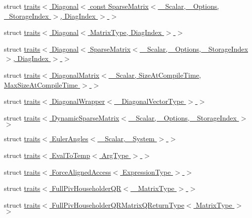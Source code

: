\begin{DoxyCompactItemize}
\item 
struct \hyperlink{struct_eigen_1_1internal_1_1traits_3_01_diagonal_3_01const_01_sparse_matrix_3_01___scalar_00_01_60e2cc1eeaa955bbaca3dbe42dd8c748}{traits$<$ Diagonal$<$ const Sparse\+Matrix$<$ \+\_\+\+Scalar, \+\_\+\+Options, \+\_\+\+Storage\+Index $>$, Diag\+Index $>$ $>$}
\item 
struct \hyperlink{struct_eigen_1_1internal_1_1traits_3_01_diagonal_3_01_matrix_type_00_01_diag_index_01_4_01_4}{traits$<$ Diagonal$<$ Matrix\+Type, Diag\+Index $>$ $>$}
\item 
struct \hyperlink{struct_eigen_1_1internal_1_1traits_3_01_diagonal_3_01_sparse_matrix_3_01___scalar_00_01___option6bd26e34064fdba33a44f3bb621d4cca}{traits$<$ Diagonal$<$ Sparse\+Matrix$<$ \+\_\+\+Scalar, \+\_\+\+Options, \+\_\+\+Storage\+Index $>$, Diag\+Index $>$ $>$}
\item 
struct \hyperlink{struct_eigen_1_1internal_1_1traits_3_01_diagonal_matrix_3_01___scalar_00_01_size_at_compile_timeb0b2868b66e3b20cd28c00acb4409967}{traits$<$ Diagonal\+Matrix$<$ \+\_\+\+Scalar, Size\+At\+Compile\+Time, Max\+Size\+At\+Compile\+Time $>$ $>$}
\item 
struct \hyperlink{struct_eigen_1_1internal_1_1traits_3_01_diagonal_wrapper_3_01___diagonal_vector_type_01_4_01_4}{traits$<$ Diagonal\+Wrapper$<$ \+\_\+\+Diagonal\+Vector\+Type $>$ $>$}
\item 
struct \hyperlink{struct_eigen_1_1internal_1_1traits_3_01_dynamic_sparse_matrix_3_01___scalar_00_01___options_00_01___storage_index_01_4_01_4}{traits$<$ Dynamic\+Sparse\+Matrix$<$ \+\_\+\+Scalar, \+\_\+\+Options, \+\_\+\+Storage\+Index $>$ $>$}
\item 
struct \hyperlink{struct_eigen_1_1internal_1_1traits_3_01_euler_angles_3_01___scalar_00_01___system_01_4_01_4}{traits$<$ Euler\+Angles$<$ \+\_\+\+Scalar, \+\_\+\+System $>$ $>$}
\item 
struct \hyperlink{struct_eigen_1_1internal_1_1traits_3_01_eval_to_temp_3_01_arg_type_01_4_01_4}{traits$<$ Eval\+To\+Temp$<$ Arg\+Type $>$ $>$}
\item 
struct \hyperlink{struct_eigen_1_1internal_1_1traits_3_01_force_aligned_access_3_01_expression_type_01_4_01_4}{traits$<$ Force\+Aligned\+Access$<$ Expression\+Type $>$ $>$}
\item 
struct \hyperlink{struct_eigen_1_1internal_1_1traits_3_01_full_piv_householder_q_r_3_01___matrix_type_01_4_01_4}{traits$<$ Full\+Piv\+Householder\+Q\+R$<$ \+\_\+\+Matrix\+Type $>$ $>$}
\item 
struct \hyperlink{struct_eigen_1_1internal_1_1traits_3_01_full_piv_householder_q_r_matrix_q_return_type_3_01_matrix_type_01_4_01_4}{traits$<$ Full\+Piv\+Householder\+Q\+R\+Matrix\+Q\+Return\+Type$<$ Matrix\+Type $>$ $>$}

\end{DoxyCompactItemize}
